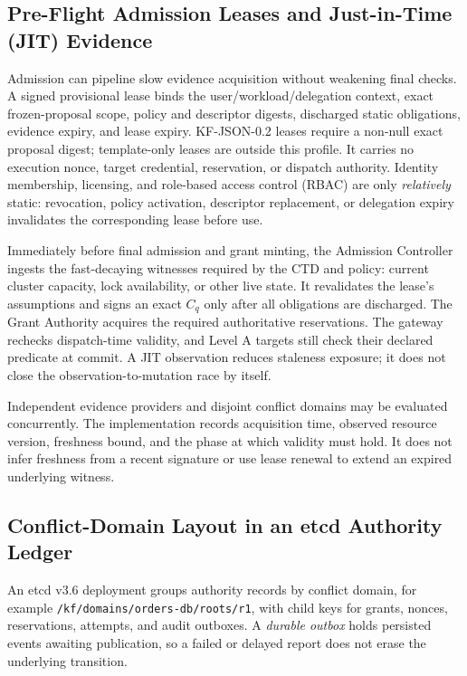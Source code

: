 \subsection{Pre-Flight Admission Leases and Just-in-Time (JIT) Evidence}
\label{sec:admission-lease}
Admission can pipeline slow evidence acquisition without weakening final checks. A signed provisional lease binds the user/workload/delegation context, exact frozen-proposal scope, policy and descriptor digests, discharged static obligations, evidence expiry, and lease expiry. KF-JSON-0.2 leases require a non-null exact proposal digest; template-only leases are outside this profile. It carries no execution nonce, target credential, reservation, or dispatch authority. Identity membership, licensing, and role-based access control (RBAC) are only \emph{relatively} static: revocation, policy activation, descriptor replacement, or delegation expiry invalidates the corresponding lease before use.

Immediately before final admission and grant minting, the Admission Controller ingests the fast-decaying witnesses required by the CTD and policy: current cluster capacity, lock availability, or other live state. It revalidates the lease's assumptions and signs an exact $C_q$ only after all obligations are discharged. The Grant Authority acquires the required authoritative reservations. The gateway rechecks dispatch-time validity, and Level A targets still check their declared predicate at commit. A JIT observation reduces staleness exposure; it does not close the observation-to-mutation race by itself.

Independent evidence providers and disjoint conflict domains may be evaluated concurrently. The implementation records acquisition time, observed resource version, freshness bound, and the phase at which validity must hold. It does not infer freshness from a recent signature or use lease renewal to extend an expired underlying witness.

\subsection{Conflict-Domain Layout in an etcd Authority Ledger}
\label{sec:etcd-layout}
An etcd v3.6 deployment groups authority records by conflict domain, for example \nolinkurl{/kf/domains/orders-db/roots/r1}, with child keys for grants, nonces, reservations, attempts, and audit outboxes. A \emph{durable outbox} holds persisted events awaiting publication, so a failed or delayed report does not erase the underlying transition.

